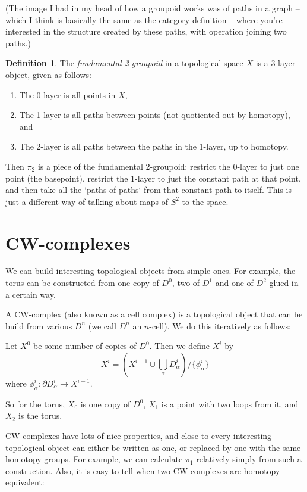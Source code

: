 \documentclass[a4paper,12pt]{article}
\newcommand{\del}{\partial}
\theoremstyle{definition}
\newtheorem*{defn}{Definition}
\begin{document}
(The image I had in my head of how a groupoid works was of paths in a graph -- which I think is basically the same as the category definition -- where you're interested in the structure created by these paths, with operation joining two paths.)

\begin{defn}
The \emph{fundamental 2-groupoid} in a topological space $X$ is a 3-layer object, given as follows:
\begin{enumerate}[start=0]
\item The 0-layer is all points in $X$,
\item The 1-layer is all paths between points (\underline{not} quotiented out by homotopy), and
\item The 2-layer is all paths between the paths in the 1-layer, up to homotopy.
\end{enumerate}
\end{defn}

Then $\pi_2$ is a piece of the fundamental 2-groupoid: restrict the 0-layer to just one point (the basepoint), restrict the 1-layer to just the constant path at that point, and then take all the `paths of paths` from that constant path to itself. This is just a different way of talking about maps of $S^2$ to the space.

\section{CW-complexes}

We can build interesting topological objects from simple ones.
For example, the torus can be constructed from one copy of $D^0$, two of $D^1$ and one of $D^2$ glued in a certain way.

A CW-complex (also known as a cell complex) is a topological object that can be build from various $D^n$ (we call $D^n$ an $n$-cell).
We do this iteratively as follows:

Let $X^0$ be some number of copies of $D^0$.
Then we define $X^i$ by
$$X^i = (X^{i-1}\cup \bigcup_{\alpha} D_{\alpha}^i)/\{\phi_\alpha^i\}$$
where $\phi_\alpha^i: \del D_\alpha^i\to X^{i-1}$.

So for the torus, $X_0$ is one copy of $D^0$, $X_1$ is a point with two loops from it, and $X_2$ is the torus.

CW-complexes have lots of nice properties, and close to every interesting topological object can either be written as one, or replaced by one with the same homotopy groups.
For example, we can calculate $\pi_1$ relatively simply from such a construction.
Also, it is easy to tell when two CW-complexes are homotopy equivalent:
\end{document}
